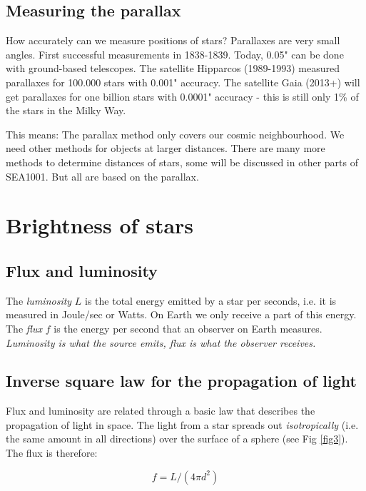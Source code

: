 \subsection{Measuring the parallax}

How accurately can we measure positions of stars? Parallaxes are very small angles. First successful measurements in 1838-1839. Today, 0.05" can be done with ground-based telescopes. The satellite Hipparcos (1989-1993) measured parallaxes for 100.000 stars with 0.001" accuracy. The satellite Gaia (2013+) will get parallaxes for one billion stars with 0.0001" accuracy - this is still only 1\% of the stars in the Milky Way.

This means: The parallax method only covers our cosmic neighbourhood. We need other methods for objects at larger distances. There are many more methods to determine distances of stars, some will be discussed in other parts of SEA1001. But all are based on the parallax.

\section{Brightness of stars}

\subsection{Flux and luminosity}

The \textit{luminosity} $L$ is the total energy emitted by a star per seconds, i.e. it is measured in Joule/sec or Watts. On Earth we only receive a part of this energy. The \textit{flux} $f$ is the energy per second that an observer on Earth measures. \textit{Luminosity is what the source emits, flux is what the observer receives.}

\subsection{Inverse square law for the propagation of light}

Flux and luminosity are related through a basic law that describes the propagation of light in space. The light from a star spreads out \textit{isotropically} (i.e. the same amount in all directions) over the surface of a sphere (see Fig \ref{fig3}). The flux is therefore:

\begin{equation}
f = L / (4 \pi d^2)
\label{eq3}
\end{equation}


